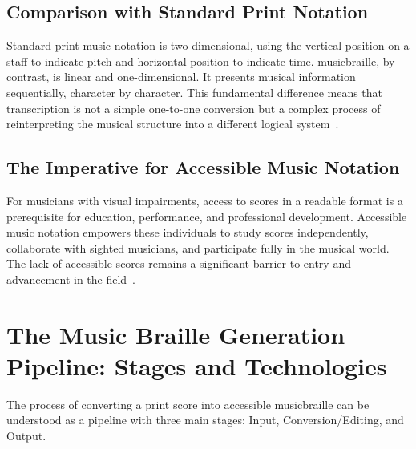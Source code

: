 \subsection{Comparison with Standard Print Notation}\label{ch10:ssec:comparison-with-print}
Standard print music notation is two-dimensional, using the vertical position on a staff to indicate pitch and horizontal position to indicate time. \gls{musicbraille}, by contrast, is linear and one-dimensional. It presents musical information sequentially, character by character. This fundamental difference means that transcription is not a simple one-to-one conversion but a complex process of reinterpreting the musical structure into a different logical system~\supercite{rnib-braille-music}.

\subsection{The Imperative for Accessible Music Notation}\label{ch10:ssec:imperative-for-accessibility}
For musicians with visual impairments, access to scores in a readable format is a prerequisite for education, performance, and professional development. Accessible music notation empowers these individuals to study scores independently, collaborate with sighted musicians, and participate fully in the musical world. The lack of accessible scores remains a significant barrier to entry and advancement in the field~\supercite{MusicAccessibilityResources}.

\section{The Music Braille Generation Pipeline: Stages and Technologies}\label{ch10:sec:pipeline}
The process of converting a print score into accessible \gls{musicbraille} can be understood as a pipeline with three main stages: Input, Conversion/Editing, and Output.

